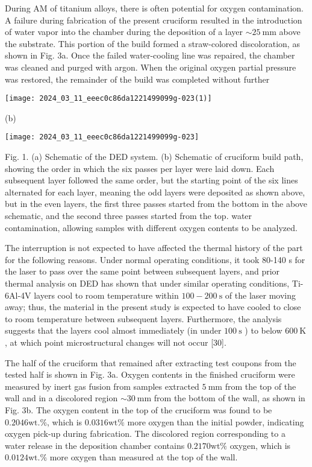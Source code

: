 \documentclass[10pt]{article}
\begin{document}
During AM of titanium alloys, there is often potential for oxygen contamination. A failure during fabrication of the present cruciform resulted in the introduction of water vapor into the chamber during the deposition of a layer $\sim 25 \mathrm{~mm}$ above the substrate. This portion of the build formed a straw-colored discoloration, as shown in Fig. 3a. Once the failed water-cooling line was repaired, the chamber was cleaned and purged with argon. When the original oxygen partial pressure was restored, the remainder of the build was completed without further

\begin{center}
\texttt{[image: 2024\_03\_11\_eeec0c86da1221499099g-023(1)]}
\end{center}

(b)

\begin{center}
\texttt{[image: 2024\_03\_11\_eeec0c86da1221499099g-023]}
\end{center}

Fig. 1. (a) Schematic of the DED system. (b) Schematic of cruciform build path, showing the order in which the six passes per layer were laid down. Each subsequent layer followed the same order, but the starting point of the six lines alternated for each layer, meaning the odd layers were deposited as shown above, but in the even layers, the first three passes started from the bottom in the above schematic, and the second three passes started from the top. water contamination, allowing samples with different oxygen contents to be analyzed.

The interruption is not expected to have affected the thermal history of the part for the following reasons. Under normal operating conditions, it took 80-140 s for the laser to pass over the same point between subsequent layers, and prior thermal analysis on DED has shown that under similar operating conditions, Ti-6Al-4V layers cool to room temperature within $100-200 \mathrm{~s}$ of the laser moving away; thus, the material in the present study is expected to have cooled to close to room temperature between subsequent layers. Furthermore, the analysis suggests that the layers cool almost immediately (in under $100 \mathrm{~s}$ ) to below $600 \mathrm{~K}$, at which point microstructural changes will not occur [30].

The half of the cruciform that remained after extracting test coupons from the tested half is shown in Fig. 3a. Oxygen contents in the finished cruciform were measured by inert gas fusion from samples extracted $5 \mathrm{~mm}$ from the top of the wall and in a discolored region $\sim 30 \mathrm{~mm}$ from the bottom of the wall, as shown in Fig. 3b. The oxygen content in the top of the cruciform was found to be $0.2046 \mathrm{wt} . \%$, which is $0.0316 \mathrm{wt} \%$ more oxygen than the initial powder, indicating oxygen pick-up during fabrication. The discolored region corresponding to a water release in the deposition chamber contains $0.2170 \mathrm{wt} \%$ oxygen, which is $0.0124 \mathrm{wt} . \%$ more oxygen than measured at the top of the wall.
\end{document}
